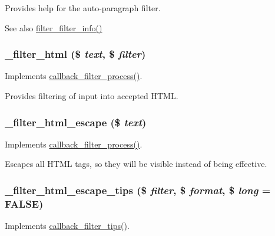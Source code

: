 Provides help for the auto-\/paragraph filter.

\begin{DoxySeeAlso}{See also}
\hyperlink{group__standard__filters_ga38089b90576e648c56228ee99c9c1767}{filter\_\-filter\_\-info()} 
\end{DoxySeeAlso}
\hypertarget{group__standard__filters_gaf366f72c1453f7295de4049269067a40}{
\subsubsection[{\_\-filter\_\-html}]{\setlength{\rightskip}{0pt plus 5cm}\_\-filter\_\-html (\$ {\em text}, \/  \$ {\em filter})}}
\label{group__standard__filters_gaf366f72c1453f7295de4049269067a40}
Implements \hyperlink{group__callbacks_ga5f82accd878d144a22ea2dfec253f91d}{callback\_\-filter\_\-process()}.

Provides filtering of input into accepted HTML. \hypertarget{group__standard__filters_ga5ea934ce6b9314fdb97a572fa3530631}{
\subsubsection[{\_\-filter\_\-html\_\-escape}]{\setlength{\rightskip}{0pt plus 5cm}\_\-filter\_\-html\_\-escape (\$ {\em text})}}
\label{group__standard__filters_ga5ea934ce6b9314fdb97a572fa3530631}
Implements \hyperlink{group__callbacks_ga5f82accd878d144a22ea2dfec253f91d}{callback\_\-filter\_\-process()}.

Escapes all HTML tags, so they will be visible instead of being effective. \hypertarget{group__standard__filters_gaea4abc943473d502360f1448bf66b1a2}{
\subsubsection[{\_\-filter\_\-html\_\-escape\_\-tips}]{\setlength{\rightskip}{0pt plus 5cm}\_\-filter\_\-html\_\-escape\_\-tips (\$ {\em filter}, \/  \$ {\em format}, \/  \$ {\em long} = {\ttfamily FALSE})}}
\label{group__standard__filters_gaea4abc943473d502360f1448bf66b1a2}
Implements \hyperlink{group__callbacks_gabe5ee7c795e0adac0bccb8061006949e}{callback\_\-filter\_\-tips()}.

